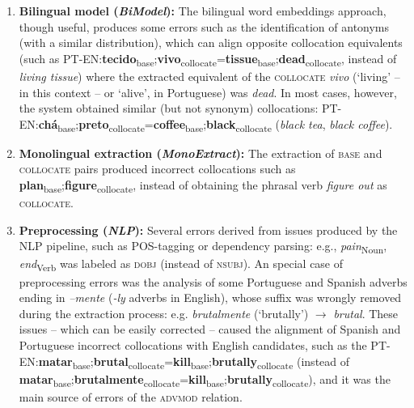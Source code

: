 \documentclass[output=paper
,modfonts
,nonflat]{langsci/langscibook}
\begin{document}
\begin{enumerate}
\item \textbf{Bilingual model (\textit{BiModel}):} The bilingual word embeddings approach,
  though useful, produces some errors such as the identification of antonyms
  (with a similar distribution), which can align opposite collocation
  equivalents (such as PT-EN:\textbf{tecido}\textsubscript{base};\textbf{vivo}\textsubscript{collocate}=\textbf{tissue}\textsubscript{base};\textbf{dead}\textsubscript{collocate}, instead of \textit{living tissue})
  where the extracted equivalent of the \textsc{collocate} \textit{vivo} (`living' -- in this context -- or `alive', in Portuguese)
  was \textit{dead}. In most cases, however, the system obtained similar
  (but not synonym) collocations: PT-EN:\textbf{chá}\textsubscript{base};\textbf{preto}\textsubscript{collocate}=\textbf{coffee}\textsubscript{base};\textbf{black}\textsubscript{collocate}
  (\textit{black tea}, \textit{black coffee}).

\item \textbf{Monolingual extraction (\textit{MonoExtract}):} The extraction of \textsc{base} and
  \textsc{collocate} pairs produced incorrect collocations such as
  \textbf{plan}\textsubscript{base};\textbf{figure}\textsubscript{collocate},
  instead of obtaining the phrasal verb \textit{figure out} as \textsc{collocate}.  
  
\item \textbf{Preprocessing (\textit{NLP}):} Several errors derived from issues produced
  by the NLP pipeline, such as POS-tagging or dependency parsing:
  e.g., \textit{pain}\textsubscript{Noun},\\\textit{end}\textsubscript{Verb} was labeled
  as \textsc{dobj} (instead of \textsc{nsubj}).
  An special case of preprocessing errors was the analysis of some Portuguese
  and Spanish adverbs ending in \emph{--mente} (\emph{-ly} adverbs in English),
  whose suffix was wrongly removed during the extraction process: e.g. \textit{brutalmente}
  (`brutally') $\rightarrow$ \textit{brutal}. These issues -- which can be easily corrected --
  caused the alignment of Spanish and Portuguese incorrect collocations with
  English candidates, such as the PT-EN:\textbf{matar}\textsubscript{base};\textbf{brutal}\textsubscript{collocate}=\textbf{kill}\textsubscript{base};\textbf{brutally}\textsubscript{collocate} (instead of \textbf{matar}\textsubscript{base};\textbf{brutalmente}\textsubscript{collocate}=\textbf{kill}\textsubscript{base};\textbf{brutally}\textsubscript{collocate}), and it was the main source of errors of the \textsc{advmod} relation.


\end{enumerate}
\end{document}
